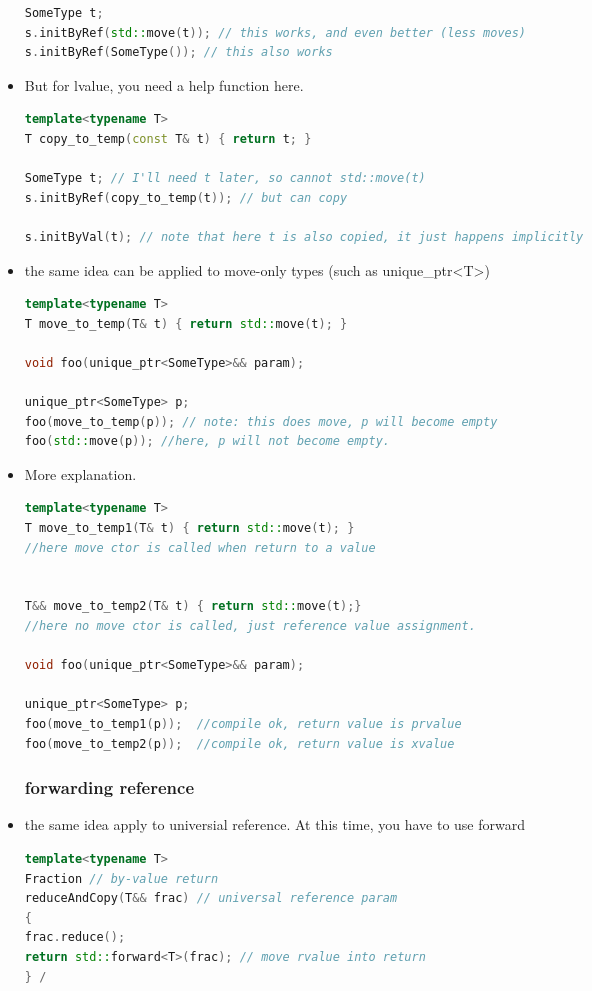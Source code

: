 \documentclass[a4paper,12pt,twoside]{book}
\begin{document}
\begin{itemize}
\begin{lstlisting}[frame=single, language=c++]
SomeType t;
s.initByRef(std::move(t)); // this works, and even better (less moves)
s.initByRef(SomeType()); // this also works
\end{lstlisting}

\item But for lvalue, you need a help function here.
\begin{lstlisting}[frame=single, language=c++]
template<typename T>
T copy_to_temp(const T& t) { return t; }

SomeType t; // I'll need t later, so cannot std::move(t)
s.initByRef(copy_to_temp(t)); // but can copy

s.initByVal(t); // note that here t is also copied, it just happens implicitly
\end{lstlisting}

\item the same idea can be applied to move-only types (such as unique\_ptr<T>)
\begin{lstlisting}[frame=single, language=c++]
template<typename T>
T move_to_temp(T& t) { return std::move(t); }

void foo(unique_ptr<SomeType>&& param);

unique_ptr<SomeType> p;
foo(move_to_temp(p)); // note: this does move, p will become empty
foo(std::move(p)); //here, p will not become empty. 
\end{lstlisting}


\item More explanation.
\begin{lstlisting}[frame=single, language=c++]
template<typename T>
T move_to_temp1(T& t) { return std::move(t); }
//here move ctor is called when return to a value


T&& move_to_temp2(T& t) { return std::move(t);}
//here no move ctor is called, just reference value assignment.

void foo(unique_ptr<SomeType>&& param);

unique_ptr<SomeType> p;
foo(move_to_temp1(p));  //compile ok, return value is prvalue
foo(move_to_temp2(p));  //compile ok, return value is xvalue
\end{lstlisting}

\subsubsection{forwarding reference}

\item the same idea apply to universial reference. At this time, you have to use forward 
\begin{lstlisting}[frame=single, language=c++]
template<typename T>
Fraction // by-value return
reduceAndCopy(T&& frac) // universal reference param
{
frac.reduce();
return std::forward<T>(frac); // move rvalue into return
} /
\end{lstlisting}


\end{itemize}
\end{document}
